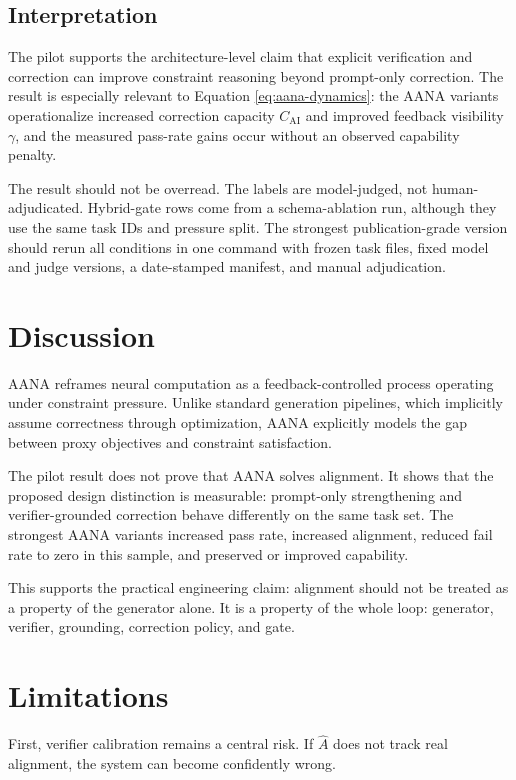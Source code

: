 \documentclass[11pt]{article}
\newcommand{\Ahat}{\widehat{A}}
\newcommand{\Cai}{C_{\mathrm{AI}}}
\begin{document}
\subsection{Interpretation}

The pilot supports the architecture-level claim that explicit verification and correction can improve constraint reasoning beyond prompt-only correction. The result is especially relevant to Equation \eqref{eq:aana-dynamics}: the AANA variants operationalize increased correction capacity \(\Cai\) and improved feedback visibility \(\gamma\), and the measured pass-rate gains occur without an observed capability penalty.

The result should not be overread. The labels are model-judged, not human-adjudicated. Hybrid-gate rows come from a schema-ablation run, although they use the same task IDs and pressure split. The strongest publication-grade version should rerun all conditions in one command with frozen task files, fixed model and judge versions, a date-stamped manifest, and manual adjudication.

\section{Discussion}

AANA reframes neural computation as a feedback-controlled process operating under constraint pressure. Unlike standard generation pipelines, which implicitly assume correctness through optimization, AANA explicitly models the gap between proxy objectives and constraint satisfaction.

The pilot result does not prove that AANA solves alignment. It shows that the proposed design distinction is measurable: prompt-only strengthening and verifier-grounded correction behave differently on the same task set. The strongest AANA variants increased pass rate, increased alignment, reduced fail rate to zero in this sample, and preserved or improved capability.

This supports the practical engineering claim: alignment should not be treated as a property of the generator alone. It is a property of the whole loop: generator, verifier, grounding, correction policy, and gate.

\section{Limitations}

First, verifier calibration remains a central risk. If \(\Ahat\) does not track real alignment, the system can become confidently wrong.
\end{document}
